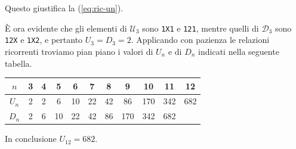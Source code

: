 {Questo giustifica la (\ref{eq:ric-un}). 

È ora evidente che gli elementi di $\mathcal{U}_{3}$ sono
\texttt{1X1} e \texttt{121}, mentre quelli di $\mathcal{D}_{3}$ sono
\texttt{12X} e \texttt{1X2}, e pertanto $U_{3}=D_{3}=2$.  Applicando
con pazienza le relazioni ricorrenti troviamo pian piano i valori di $U_{n}$ e di $D_{n}$ indicati nella seguente tabella.
\begin{center}
	\renewcommand{\arraystretch}{1.2}
	\begin{tabular}{|c||c|c|c|c|c|c|c|c|c|c|}
		\hline
		$n$ & 3 & 4 & 5 & 6 & 7 & 8 & 9 & 10 & 11 & 12  \\
		\hline\hline
		$U_{n}$ & 2 & 2 & 6 & 10 & 22 & 42 & 86 & 170 & 342 & 682  \\
		\hline
		$D_{n}$ & 2 & 6 & 10 & 22 & 42 & 86 & 170 & 342 & 682 &   \\
		\hline
	\end{tabular}
\end{center}

In conclusione $U_{12}=682$.
}

